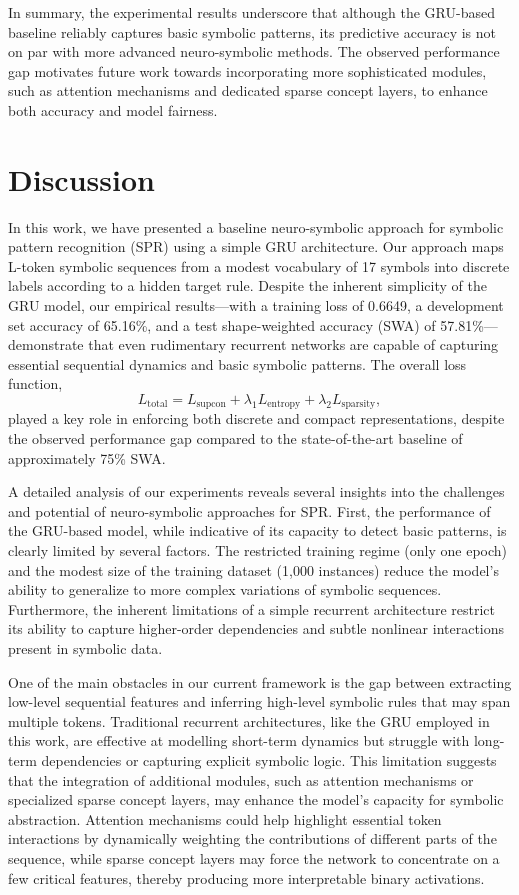 \documentclass[12pt]{article}
\begin{document}
In summary, the experimental results underscore that although the GRU-based baseline reliably captures basic symbolic patterns, its predictive accuracy is not on par with more advanced neuro-symbolic methods. The observed performance gap motivates future work towards incorporating more sophisticated modules, such as attention mechanisms and dedicated sparse concept layers, to enhance both accuracy and model fairness.

\section{Discussion}
In this work, we have presented a baseline neuro-symbolic approach for symbolic pattern recognition (SPR) using a simple GRU architecture. Our approach maps L-token symbolic sequences from a modest vocabulary of 17 symbols into discrete labels according to a hidden target rule. Despite the inherent simplicity of the GRU model, our empirical results—with a training loss of 0.6649, a development set accuracy of 65.16\%, and a test shape-weighted accuracy (SWA) of 57.81\%—demonstrate that even rudimentary recurrent networks are capable of capturing essential sequential dynamics and basic symbolic patterns. The overall loss function,
\[
L_{\text{total}} = L_{\text{supcon}} + \lambda_1 L_{\text{entropy}} + \lambda_2 L_{\text{sparsity}},
\]
played a key role in enforcing both discrete and compact representations, despite the observed performance gap compared to the state-of-the-art baseline of approximately 75\% SWA.

A detailed analysis of our experiments reveals several insights into the challenges and potential of neuro-symbolic approaches for SPR. First, the performance of the GRU-based model, while indicative of its capacity to detect basic patterns, is clearly limited by several factors. The restricted training regime (only one epoch) and the modest size of the training dataset (1,000 instances) reduce the model's ability to generalize to more complex variations of symbolic sequences. Furthermore, the inherent limitations of a simple recurrent architecture restrict its ability to capture higher-order dependencies and subtle nonlinear interactions present in symbolic data. 

One of the main obstacles in our current framework is the gap between extracting low-level sequential features and inferring high-level symbolic rules that may span multiple tokens. Traditional recurrent architectures, like the GRU employed in this work, are effective at modelling short-term dynamics but struggle with long-term dependencies or capturing explicit symbolic logic. This limitation suggests that the integration of additional modules, such as attention mechanisms or specialized sparse concept layers, may enhance the model's capacity for symbolic abstraction. Attention mechanisms could help highlight essential token interactions by dynamically weighting the contributions of different parts of the sequence, while sparse concept layers may force the network to concentrate on a few critical features, thereby producing more interpretable binary activations.
\end{document}
